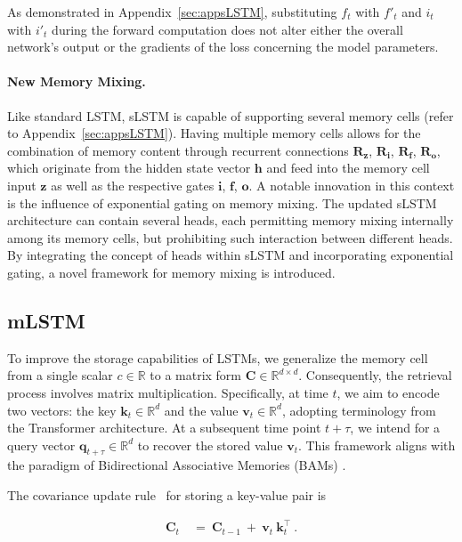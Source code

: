 As demonstrated in Appendix~\ref{sec:appsLSTM}, substituting $f_t$ with $f'_t$ and $i_t$ with $i'_t$ during the forward computation does not alter either the overall network's output or the gradients of the loss concerning the model parameters.

\paragraph{New Memory Mixing.} Like standard LSTM, sLSTM is capable of supporting several memory cells (refer to Appendix~\ref{sec:appsLSTM}).
Having multiple memory cells allows for the combination of memory content through recurrent connections $\mathbf{R}_{\mathbf{z}}$, $\mathbf{R}_{\mathbf{i}}$, $\mathbf{R}_{\mathbf{f}}$, $\mathbf{R}_{\mathbf{o}}$, which originate from the hidden state vector $\mathbf{h}$ and feed into the memory cell input $\mathbf{z}$ as well as the respective gates $\mathbf{i}$, $\mathbf{f}$, $\mathbf{o}$. 
A notable innovation in this context is the influence of exponential gating on memory mixing. The updated sLSTM architecture can contain several heads, each permitting memory mixing internally among its memory cells, but prohibiting such interaction between different heads. By integrating the concept of heads within sLSTM and incorporating exponential gating, a novel framework for memory mixing is introduced.

\subsection{mLSTM}
\label{sec:mLSTM}

To improve the storage capabilities of LSTMs, we generalize the memory cell from a single scalar $c \in \mathbb{R}$ to a matrix form $\mathbf{C} \in \mathbb{R}^{d \times d}$. Consequently, the retrieval process involves matrix multiplication. Specifically, at time $t$, we aim to encode two vectors: the key $\mathbf{k}_t \in \mathbb{R}^d$ and the value $\mathbf{v}_t \in \mathbb{R}^d$, adopting terminology from the Transformer architecture. At a subsequent time point $t + \tau$, we intend for a query vector $\mathbf{q}_{t+\tau} \in \mathbb{R}^d$ to recover the stored value $\mathbf{v}_t$. This framework aligns with the paradigm of Bidirectional Associative Memories (BAMs) \citep{Kohonen:72,Anderson:72,Nakano:72,Anderson:77}.

The covariance update rule~\citep{Sejnowski:77,Dayan:91} for storing a key-value pair is

\begin{align}
\mathbf{C}_t \ &= \ \mathbf{C}_{t-1} \ + \ \mathbf{v}_{t} \ \mathbf{k}_t^\top \ .
\end{align}

